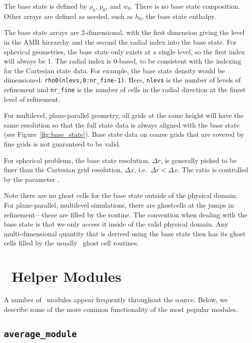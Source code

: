 The base state is defined by $\rho_0$, $p_0$, and $w_0$.  There is no
base state composition.  Other arrays are defined as needed, such as
$h_0$, the base state enthalpy.

The base state arrays are 2-dimensional, with the first dimension
giving the level in the AMR hierarchy and the second the radial index
into the base state.  For spherical geometries, the base state only
exists at a single level, so the first index will always be 1.  The
radial index is 0-based, to be consistent with the indexing for the
Cartesian state data.  For example, the base state density would be
dimensioned: {\tt rho0(nlevs,0:nr\_fine-1)}.  Here, {\tt nlevs} is the
number of levels of refinement and {\tt nr\_fine} is the number of
cells in the radial direction at the finest level of refinement.

For multilevel, plane-parallel geometry, all grids at the same height
will have the same resolution so that the full state data is always
aligned with the base state (see Figure~\ref{fig:base_state}).  Base
state data on coarse grids that are covered by fine grids is not
guaranteed to be valid.

For spherical problems, the base state resolution, $\Delta r$, is
generally picked to be finer than the Cartesian grid resolution,
$\Delta x$, i.e.\ $\Delta r < \Delta x$.  The ratio is controlled
by the parameter .

Note there are no ghost cells for the base state outside of the
physical domain.  For plane-parallel, multilevel simulations, there
are ghostcells at the jumps in refinement---these are filled by the
 routine.  The convention when dealing with the
base state is that we only access it inside of the valid physical
domain.  Any multi-dimensional quantity that is derived using the base
state then has its ghost cells filled by the usually \multifab\ ghost
cell routines.


\section{\maestro\ Helper Modules}

A number of \maestro\ modules appear frequently throughout the source.
Below, we describe some of the more common functionality of the most
popular modules.

\subsection{\tt average\_module}

